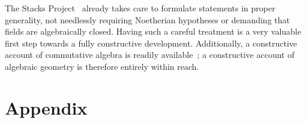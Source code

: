 \documentclass[10pt,reqno,a4paper]{amsbook}
\theoremstyle{definition}
\theoremstyle{plain}
\theoremstyle{remark}
\newcommand{\?}{\,{:}\,}
\renewcommand{\_}{\mathpunct{.}\,}
\begin{document}
{The Stacks Project~\cite{stacks-project} already takes care to formulate
statements in proper generality, not needlessly requiring Noetherian hypotheses
or demanding that fields are algebraically closed. Having such a careful
treatment is a very valuable first step towards a fully constructive development.
Additionally, a constructive account of commutative algebra is readily
available~\cite{mines-richman-ruitenburg:constructive-algebra,lombardi:quitte:constructive-algebra};
a constructive account of algebraic geometry is therefore entirely within
reach.

}


\chapter*{Appendix}

\setcounter{saved-section-number}{\value{section}}
\end{document}
